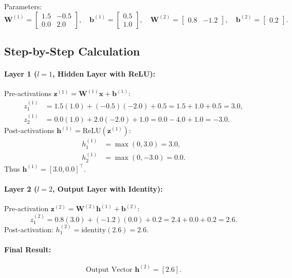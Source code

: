 \documentclass[11pt]{article}
\begin{document}
Parameters:
\begin{equation}
\mathbf{W}^{(1)} = \begin{bmatrix} 1.5 & -0.5 \\ 0.0 & 2.0 \end{bmatrix}, \quad
\mathbf{b}^{(1)} = \begin{bmatrix} 0.5 \\ 1.0 \end{bmatrix}, \quad
\mathbf{W}^{(2)} = \begin{bmatrix} 0.8 & -1.2 \end{bmatrix}, \quad
\mathbf{b}^{(2)} = \begin{bmatrix} 0.2 \end{bmatrix}.
\end{equation}

\subsection{Step-by-Step Calculation}
\paragraph{Layer 1 ($l=1$, Hidden Layer with ReLU):}
Pre-activations $\mathbf{z}^{(1)} = \mathbf{W}^{(1)} \mathbf{x} + \mathbf{b}^{(1)}$:
\begin{align}
z_1^{(1)} &= 1.5(1.0) + (-0.5)(-2.0) + 0.5 = 1.5 + 1.0 + 0.5 = 3.0, \\
z_2^{(1)} &= 0.0(1.0) + 2.0(-2.0) + 1.0 = 0.0 - 4.0 + 1.0 = -3.0.
\end{align}
Post-activations $\mathbf{h}^{(1)} = \text{ReLU}(\mathbf{z}^{(1)})$:
\begin{align}
h_1^{(1)} &= \max(0, 3.0) = 3.0, \\
h_2^{(1)} &= \max(0, -3.0) = 0.0.
\end{align}
Thus $\mathbf{h}^{(1)} = [3.0, 0.0]^\top$.

\paragraph{Layer 2 ($l=2$, Output Layer with Identity):}
Pre-activation $\mathbf{z}^{(2)} = \mathbf{W}^{(2)} \mathbf{h}^{(1)} + \mathbf{b}^{(2)}$:
\begin{equation}
z_1^{(2)} = 0.8(3.0) + (-1.2)(0.0) + 0.2 = 2.4 + 0.0 + 0.2 = 2.6.
\end{equation}
Post-activation: $h_1^{(2)} = \text{identity}(2.6) = 2.6$.

\paragraph{Final Result:}
\begin{equation}
\text{Output Vector } \mathbf{h}^{(2)} = [2.6].
\end{equation}
\end{document}
